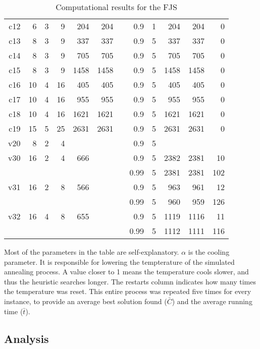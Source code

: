 \documentclass[a4paper,10pt]{article}
\begin{document}
\begin{table}[h]
\begin{tabular}{@{\bfseries}rrrrrrrrrrrr}
	c12  &  6 &  3 &  9 &  204 &  204 &&    0.9 & 1 &  204 &  204 &    0 \\
	c13  &  8 &  3 &  9 &  337 &  337 &&    0.9 & 5 &  337 &  337 &    0 \\
	c14  &  8 &  3 &  9 &  705 &  705 &&    0.9 & 5 &  705 &  705 &    0 \\
	c15  &  8 &  3 &  9 & 1458 & 1458 &&    0.9 & 5 & 1458 & 1458 &    0 \\
	c16  & 10 &  4 & 16 &  405 &  405 &&    0.9 & 5 &  405 &  405 &    0 \\
	c17  & 10 &  4 & 16 &  955 &  955 &&    0.9 & 5 &  955 &  955 &    0 \\
	c18  & 10 &  4 & 16 & 1621 & 1621 &&    0.9 & 5 & 1621 & 1621 &    0 \\
	c19  & 15 &  5 & 25 & 2631 & 2631 &&    0.9 & 5 & 2631 & 2631 &    0 \\[2ex]
	v20  &  8 &  2 &  4 &      &      &&    0.9 & 5 &      &      &      \\
	v30  & 16 &  2 &  4 &  666 &      &&    0.9 & 5 & 2382 & 2381 &   10 \\
	     &    &    &    &      &      &&   0.99 & 5 & 2381 & 2381 &  102 \\
	v31  & 16 &  2 &  8 &  566 &      &&    0.9 & 5 &  963 &  961 &   12 \\
	     &    &    &    &      &      &&   0.99 & 5 &  960 &  959 &  126 \\
	v32  & 16 &  4 &  8 &  655 &      &&    0.9 & 5 & 1119 & 1116 &   11 \\
	     &    &    &    &      &      &&   0.99 & 5 & 1112 & 1111 &  116 \\
	\bottomrule
\end{tabular}
\caption{Computational results for the FJS}
\label{table:fjs}
\end{table}

Most of the parameters in the table are self-explanatory. $\alpha$ is the cooling parameter. It is responsible for lowering the tempterature of the simulated annealing process. A value closer to 1 means the temperature cools slower, and thus the heuristic searches longer. The restarts column indicates how many times the temperature was reset. This entire process was repeated five times for every instance, to provide an average best solution found ($\bar{C}$) and the average running time ($\bar{t}$).

\subsection{Analysis}
\end{document}
